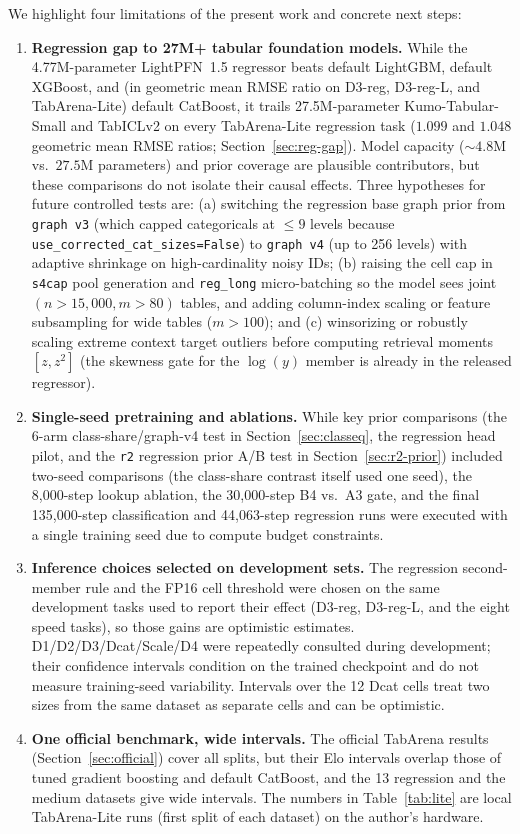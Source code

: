 \documentclass[11pt]{article}
\begin{document}
We highlight four limitations of the present work and concrete next steps:
\begin{enumerate}
\item \textbf{Regression gap to 27M+ tabular foundation models.}
While the 4.77M-parameter LightPFN~1.5 regressor beats default LightGBM, default XGBoost, and (in geometric mean RMSE ratio on D3-reg, D3-reg-L, and TabArena-Lite) default CatBoost, it trails 27.5M-parameter Kumo-Tabular-Small and TabICLv2 on every TabArena-Lite regression task ($1.099$ and $1.048$ geometric mean RMSE ratios; Section~\ref{sec:reg-gap}). %
Model capacity ($\sim4.8\text{M}$ vs.\ $27.5\text{M}$ parameters) and prior coverage are plausible contributors, but these comparisons do not isolate their causal effects. Three hypotheses for future controlled tests are:
(a) switching the regression base graph prior from \texttt{graph v3} (which capped categoricals at $\le 9$ levels because \texttt{use\_corrected\_cat\_sizes=False}) to \texttt{graph v4} (up to 256 levels) with adaptive shrinkage on high-cardinality noisy IDs;
(b) raising the cell cap in \texttt{s4cap} pool generation and \texttt{reg\_long} micro-batching so the model sees joint $(n > 15{,}000, m > 80)$ tables, and adding column-index scaling or feature subsampling for wide tables ($m > 100$); and
(c) winsorizing or robustly scaling extreme context target outliers before computing retrieval moments $[z, z^2]$ (the skewness gate for the $\log(y)$ member is already in the released regressor).
\item \textbf{Single-seed pretraining and ablations.}
While key prior comparisons (the 6-arm class-share/graph-v4 test in Section~\ref{sec:classeq}, the regression head pilot, and the \texttt{r2} regression prior A/B test in Section~\ref{sec:r2-prior}) included two-seed comparisons (the class-share contrast itself used one seed), the 8,000-step lookup ablation, the 30,000-step B4 vs.\ A3 gate, and the final 135,000-step classification and 44,063-step regression runs were executed with a single training seed due to compute budget constraints.
\item \textbf{Inference choices selected on development sets.}
The regression second-member rule and the FP16 cell threshold were chosen on the same development tasks used to report their effect (D3-reg, D3-reg-L, and the eight speed tasks), so those gains are optimistic estimates. D1/D2/D3/Dcat/Scale/D4 were repeatedly consulted during development; their confidence intervals condition on the trained checkpoint and do not measure training-seed variability. Intervals over the 12 Dcat cells treat two sizes from the same dataset as separate cells and can be optimistic.
\item \textbf{One official benchmark, wide intervals.}
The official TabArena results (Section~\ref{sec:official}) cover all splits, but their Elo intervals overlap those of tuned gradient boosting and default CatBoost, and the 13 regression and the medium datasets give wide intervals. The numbers in Table~\ref{tab:lite} are local TabArena-Lite runs (first split of each dataset) on the author's hardware.
\end{enumerate}
\end{document}

